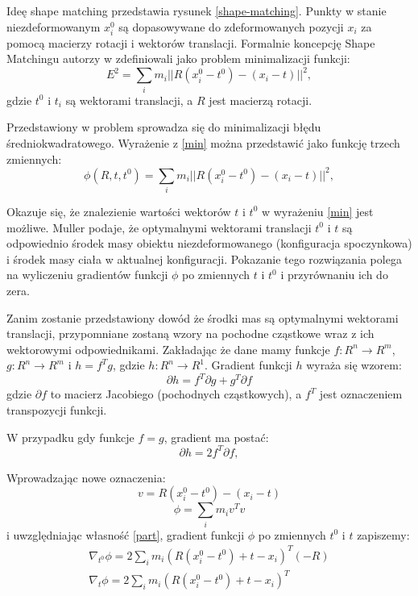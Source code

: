 Ideę shape matching przedstawia rysunek \ref{shape-matching}. Punkty w stanie
niezdeformowanym $x^0_i$ są dopasowywane do zdeformowanych pozycji $x_i$ za
pomocą macierzy rotacji i wektorów translacji. 
Formalnie koncepcję Shape Matchingu autorzy w \cite{shape} zdefiniowali jako problem minimalizacji
funkcji:
\begin{equation}
E^2 = \sum_{i} m_i ||R (x^0_i - t^0) - (x_i - t) ||^2,
\label{min}
\end{equation}
gdzie $t^0$ i $t_i$ są wektorami translacji, a $R$ jest macierzą
rotacji.

Przedstawiony w problem sprowadza się do minimalizacji błędu średniokwadratowego.
Wyrażenie z \ref{min} można przedstawić jako funkcję trzech zmiennych:
\begin{equation*}
\phi(R, t, t^0) = \sum_{i} m_i ||R (x^0_i - t^0) - (x_i - t) ||^2,
\end{equation*}

Okazuje się, że znalezienie wartości wektorów $t$ i $t^0$ w
wyrażeniu \ref{min} jest możliwe. Muller \cite{shape} podaje, że optymalnymi
wektorami translacji $t^0$ i $t$ są odpowiednio środek masy obiektu
niezdeformowanego (konfiguracja spoczynkowa) i środek masy
ciała w aktualnej konfiguracji. Pokazanie tego rozwiązania polega na
wyliczeniu gradientów funkcji $\phi$ po zmiennych $t$ i $t^0$ i przyrównaniu ich
do zera.

Zanim zostanie przedstawiony dowód że środki mas są optymalnymi wektorami
translacji, przypomniane zostaną wzory na pochodne cząstkowe wraz z ich
wektorowymi odpowiednikami. Zakładając że dane mamy funkcje $f: R^n \to R^m$,
$g: R^n \to R^m$ i $h = f^T g$, gdzie $h: R^n \to R^1$. Gradient
funkcji $h$ wyraża się wzorem:
\begin{equation*}
\partial h = f^T \partial g + g^T \partial f
\end{equation*}
gdzie $\partial f$ to macierz Jacobiego (pochodnych cząstkowych), a $f^T$ jest
oznaczeniem transpozycji funkcji.

W przypadku gdy funkcje $f = g$, gradient ma postać:
\begin{equation}
\partial h = 2 f^T \partial f,
\label{part}
\end{equation}

Wprowadzając nowe oznaczenia:
$$ v = R (x^0_i - t^0) - (x_i - t)$$
$$ \phi = \sum_i m_i v^T v$$ 
i uwzględniając własność \ref{part}, gradient funkcji $\phi$ po
zmiennych $t^0$ i $t$ zapiszemy:
\begin{eqnarray*}
\nabla_{t^0} \phi = 2 \sum_i m_i (R (x^0_i - t^0) + t - x_i)^T (-R)\\
\nabla_{t} \phi = 2 \sum_i m_i (R (x^0_i - t^0) + t - x_i)^T\\
\end{eqnarray*}

